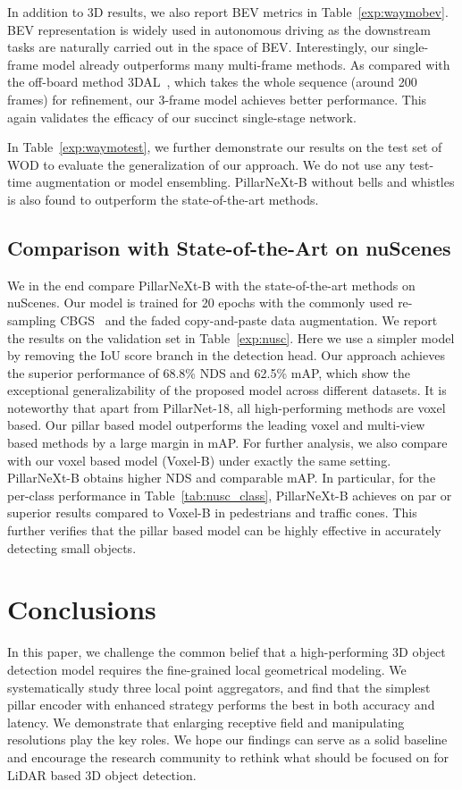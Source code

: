 \documentclass[10pt,twocolumn,letterpaper]{article}
\begin{document}
In addition to 3D results, we also report BEV metrics in Table~\ref{exp:waymobev}. BEV representation is widely used in autonomous driving as the downstream tasks are naturally carried out in the space of BEV. Interestingly, our single-frame model already outperforms many multi-frame methods. As compared with the off-board method 3DAL~\cite{qi2021offboard}, which takes the whole sequence (around 200 frames) for refinement, our 3-frame model achieves better performance. This again validates the efficacy of our succinct single-stage network.

In Table~\ref{exp:waymotest}, we further demonstrate our results on the test set of WOD to evaluate the generalization of our approach. We do not use any test-time augmentation or model ensembling. PillarNeXt-B without bells and whistles is also found to outperform the state-of-the-art methods. 



\subsection{Comparison with State-of-the-Art on nuScenes}
We in the end compare PillarNeXt-B with the state-of-the-art methods on nuScenes. Our model is trained for 20 epochs with the commonly used re-sampling CBGS~\cite{zhu2019class} and the faded copy-and-paste data augmentation. 
We report the results on the validation set in Table~\ref{exp:nusc}. Here we use a simpler model by removing the IoU score branch in the detection head. Our approach achieves the superior performance of 68.8\% NDS and 62.5\% mAP, which show the exceptional generalizability of the proposed model across different datasets. It is noteworthy that apart from PillarNet-18, all high-performing methods are voxel based. Our pillar based model outperforms the leading voxel and multi-view based methods by a large margin in mAP. For further analysis, we also compare with our voxel based model (Voxel-B) under exactly the same setting. PillarNeXt-B obtains higher NDS and comparable mAP. In particular, for the per-class performance in Table~\ref{tab:nusc_class}, PillarNeXt-B achieves on par or superior results compared to Voxel-B in pedestrians and traffic cones. This further verifies that the pillar based model can be highly effective in accurately detecting small objects. 


\section{Conclusions}
In this paper, we challenge the common belief that a high-performing 3D object detection model requires the fine-grained local geometrical modeling. We systematically study three local point aggregators, and find that the simplest pillar encoder with enhanced strategy performs the best in both accuracy and latency. We demonstrate that enlarging receptive field and manipulating resolutions play the key roles. We hope our findings can serve as a solid baseline and encourage the research community to rethink what should be focused on for LiDAR based 3D object detection. 
\end{document}
